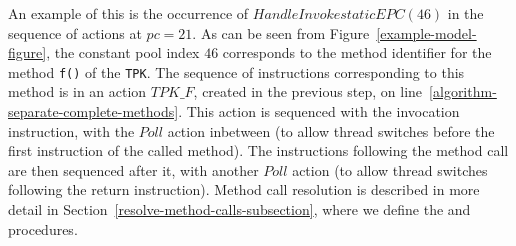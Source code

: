 An example of this is the occurrence of $HandleInvokestaticEPC(46)$ in
the sequence of actions at $pc = 21$.
As can be seen from Figure~\ref{example-model-figure}, the constant
pool index $46$ corresponds to the method identifier for the method
\texttt{f()} of the \texttt{TPK}.
The sequence of instructions corresponding to this method is in an
action $TPK\_F$, created in the previous step, on
line~\ref{algorithm-separate-complete-methods}.
This action is sequenced with the invocation instruction, with the
$Poll$ action inbetween (to allow thread switches before the first
instruction of the called method).
The instructions following the method call are then sequenced after
it, with another $Poll$ action (to allow thread switches following the
return instruction).
Method call resolution is described in more detail in
Section~\ref{resolve-method-calls-subsection}, where we define the
 and 
procedures.

